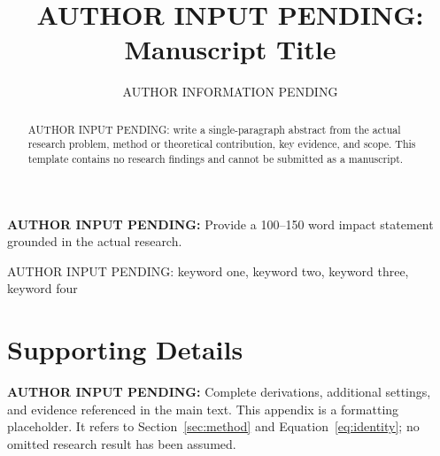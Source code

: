 \documentclass[journal]{IEEEtai}
\title{AUTHOR INPUT PENDING: Manuscript Title}\author{AUTHOR INFORMATION PENDING}
\newcommand{\AuthorPending}[1]{\textbf{AUTHOR INPUT PENDING:} #1}
\begin{document}
\maketitle
\begin{abstract}
AUTHOR INPUT PENDING: write a single-paragraph abstract from the actual research problem,
method or theoretical contribution, key evidence, and scope. This template contains
no research findings and cannot be submitted as a manuscript.
\end{abstract}
\begin{IEEEImpStatement}\AuthorPending{Provide a 100--150 word impact statement grounded in the actual research.}\end{IEEEImpStatement}
\begin{IEEEkeywords}AUTHOR INPUT PENDING: keyword one, keyword two, keyword three, keyword four\end{IEEEkeywords}


\appendix
\section{Supporting Details}
\label{app:supporting}
\AuthorPending{Complete derivations, additional settings, and evidence referenced in the main text.}
This appendix is a formatting placeholder. It refers to Section~\ref{sec:method} and
Equation~\ref{eq:identity}; no omitted research result has been assumed.
\end{document}
